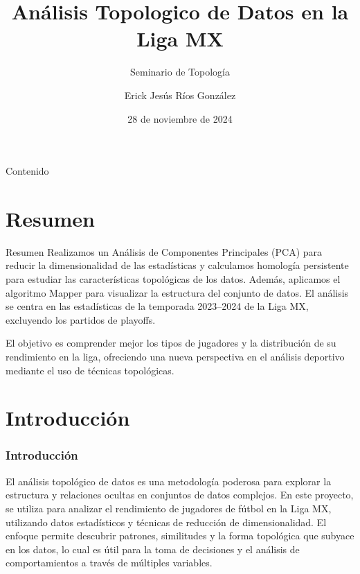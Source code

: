 \documentclass[11pt]{beamer}
\author[Erick  Ríos]{Erick Jesús Ríos González\inst{1} }
\title[TDA Liga MX]{Análisis Topologico de Datos en la Liga MX}
\date{28 de noviembre de 2024}
\subtitle{Seminario de Topología}
\institute[UNMSM]{
	\inst{1}
		Universidad Nacional Autónoma de México. Facultad de Ciencias.
	
}
\begin{document}
	
	\begin{frame}
		\maketitle
	\end{frame}

	\begin{frame}{Contenido}
		\tableofcontents
	\end{frame}

	\section{Resumen}
		\begin{frame}{Resumen}
			\justifying
			Realizamos un Análisis de Componentes Principales (PCA) para reducir la dimensionalidad de las estadísticas y calculamos homología persistente para estudiar las características topológicas de los datos. Además, aplicamos el algoritmo Mapper para visualizar la estructura del conjunto de datos. El análisis se centra en las estadísticas de la temporada 2023–2024 de la Liga MX, excluyendo los partidos de playoffs.

El objetivo es comprender mejor los tipos de jugadores y la distribución de su rendimiento en la liga, ofreciendo una nueva perspectiva en el análisis deportivo mediante el uso de técnicas topológicas.
		\end{frame}
	
	\section{Introducción}
    \begin{frame}
        \frametitle{Introducción}
        El análisis topológico de datos es una metodología poderosa para explorar la estructura y relaciones ocultas en conjuntos de datos complejos. En este proyecto, se utiliza para analizar el rendimiento de jugadores de fútbol en la Liga MX, utilizando datos estadísticos y técnicas de reducción de dimensionalidad. El enfoque permite descubrir patrones, similitudes y la forma topológica que subyace en los datos, lo cual es útil para la toma de decisiones y el análisis de comportamientos a través de múltiples variables.
        \end{frame}
		
	
\end{document}
